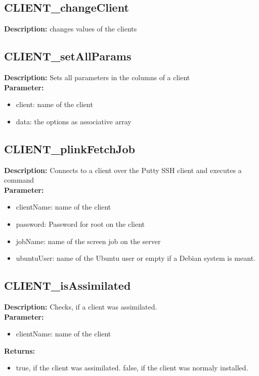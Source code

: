 \subsection{CLIENT\_changeClient}
\textbf{Description:} changes values of the clients\\

\subsection{CLIENT\_setAllParams}
\textbf{Description:} Sets all parameters in the columns of a client\\
\textbf{Parameter:}
\begin{itemize}
\item client: name of the client
\item data: the options as associative array
\end{itemize}

\subsection{CLIENT\_plinkFetchJob}
\textbf{Description:} Connects to a client over the Putty SSH client and executes a command\\
\textbf{Parameter:}
\begin{itemize}
\item clientName: name of the client
\item password: Password for root on the client
\item jobName: name of the screen job on the server
\item ubuntuUser: name of the Ubuntu user or empty if a Debian system is meant.
\end{itemize}

\subsection{CLIENT\_isAssimilated}
\textbf{Description:} Checks, if a client was assimilated.\\
\textbf{Parameter:}
\begin{itemize}
\item clientName: name of the client
\end{itemize}
\textbf{Returns:}
\begin{itemize}
\item true, if the client was assimilated. false, if the client was normaly installed.
\end{itemize}

